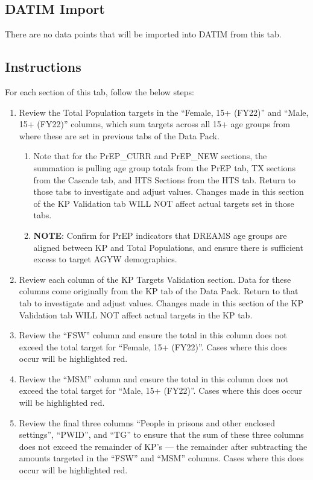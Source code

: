 \documentclass[
  openany]{book}
\begin{document}
\hypertarget{datim-import-53}{%
\subsection{DATIM Import}\label{datim-import-53}}

There are no data points that will be imported into DATIM from this tab.

\hypertarget{instructions-53}{%
\subsection{Instructions}\label{instructions-53}}

For each section of this tab, follow the below steps:

\begin{enumerate}
\def\labelenumi{\arabic{enumi}.}
\item
  Review the Total Population targets in the ``Female, 15+ (FY22)'' and
  ``Male, 15+ (FY22)'' columns, which sum targets across all 15+ age
  groups from where these are set in previous tabs of the Data Pack.

  \begin{enumerate}
  \def\labelenumii{\alph{enumii}.}
  \item
    Note that for the PrEP\_CURR and PrEP\_NEW sections, the summation
    is pulling age group totals from the PrEP tab, TX sections from
    the Cascade tab, and HTS Sections from the HTS tab. Return to
    those tabs to investigate and adjust values. Changes made in
    this section of the KP Validation tab WILL NOT affect actual
    targets set in those tabs.
  \item
    \textbf{NOTE}: Confirm for PrEP indicators that DREAMS age groups are
    aligned between KP and Total Populations, and ensure there is
    sufficient excess to target AGYW demographics.
  \end{enumerate}
\item
  Review each column of the KP Targets Validation section. Data for
  these columns come originally from the KP tab of the Data Pack.
  Return to that tab to investigate and adjust values. Changes made in
  this section of the KP Validation tab WILL NOT affect actual targets
  in the KP tab.
\item
  Review the ``FSW'' column and ensure the total in this column does not
  exceed the total target for ``Female, 15+ (FY22)''. Cases where this
  does occur will be highlighted red.
\item
  Review the ``MSM'' column and ensure the total in this column does not
  exceed the total target for ``Male, 15+ (FY22)''. Cases where this
  does occur will be highlighted red.
\item
  Review the final three columns ``People in prisons and other enclosed
  settings'', ``PWID'', and ``TG'' to ensure that the sum of these three
  columns does not exceed the remainder of KP's --- the remainder
  after subtracting the amounts targeted in the ``FSW'' and ``MSM''
  columns. Cases where this does occur will be highlighted red.
\end{enumerate}
\end{document}
